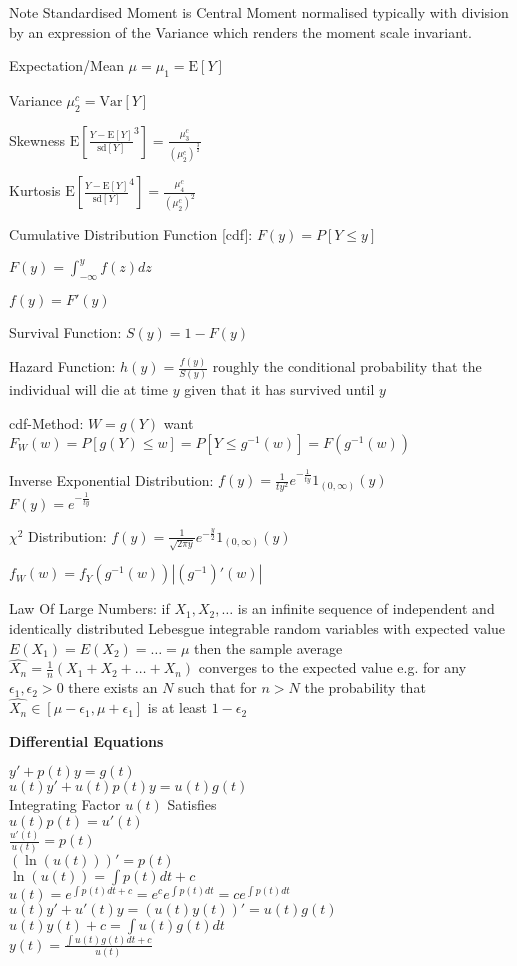 Note Standardised Moment is Central Moment normalised typically with division by an expression of the Variance which renders the moment scale invariant.

Expectation/Mean $\mu=\mu_1=\text{E}[Y]$

Variance $\mu_2^c=\text{Var}[Y]$

Skewness $\text{E}\left[ \frac{Y-\text{E}[Y]}{\text{sd}[Y]}^3 \right]=\frac{\mu_3^c}{(\mu_2^c)^{\frac{3}{2}}}$

Kurtosis $\text{E}\left[ \frac{Y-\text{E}[Y]}{\text{sd}[Y]}^4 \right]=\frac{\mu_4^c}{(\mu_2^c)^2}$

Cumulative Distribution Function [cdf]: $F(y)=P[Y\le y]$

$F(y)=\int_{-\infty}^y f(z)dz$

$f(y)=F'(y)$

Survival Function: $S(y)=1-F(y)$

Hazard Function: $h(y)=\frac{f(y)}{S(y)}$ roughly the conditional probability that the individual will die at time $y$ given that it has survived until $y$

cdf-Method: $W=g(Y)$ want $F_W(w)=P[g(Y)\le w]=P[Y\le g^{-1}(w)]=F(g^{-1}(w))$

Inverse Exponential Distribution: $f(y)=\frac{1}{ty^2}e^{-\frac{1}{ty}}1_{(0,\infty)}(y)$ \\
$F(y)=e^{-\frac{1}{ty}}$

$\chi^2$ Distribution: $f(y)=\frac{1}{\sqrt{2\pi y}}e^{-\frac{y}{2}}1_{(0,\infty)}(y)$

$f_W(w)=f_Y(g^{-1}(w))|(g^{-1})'(w)|$

Law Of Large Numbers: if $X_1,X_2,\dots$ is an infinite sequence of independent and identically distributed Lebesgue integrable random variables with expected value $E(X_1)=E(X_2)=\dots =\mu$ then the sample average $\hat{X_n}=\frac{1}{n}(X_1+X_2+\dots+X_n)$ converges to the expected value e.g. for any $\epsilon_1, \epsilon_2 > 0$ there exists an $N$ such that for $n>N$ the probability that $\hat{X_n} \in [\mu - \epsilon_1,\mu+\epsilon_1]$ is at least $1-\epsilon_2$

\newpage

\textbf{Differential Equations}

$y'+p(t)y=g(t)$ \\
$u(t)y'+u(t)p(t)y=u(t)g(t)$ \\
Integrating Factor $u(t)$ Satisfies \\
$u(t)p(t)=u'(t)$ \\
$\frac{u'(t)}{u(t)}=p(t)$ \\
$(\ln(u(t)))'=p(t)$ \\
$\ln(u(t))=\int p(t) dt + c$ \\
$u(t)=e^{\int p(t) dt + c}=e^{c}e^{\int p(t) dt}=ce^{\int p(t) dt}$ \\
$u(t)y'+u'(t)y=(u(t)y(t))'=u(t)g(t)$ \\
$u(t)y(t)+c=\int u(t)g(t) dt$ \\
$y(t)=\frac{\int u(t)g(t) dt + c}{u(t)}$

